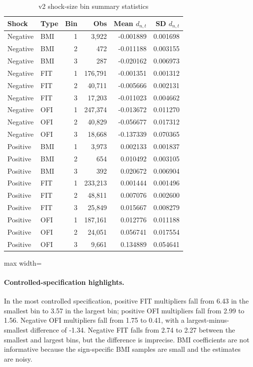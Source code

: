 \documentclass[11pt]{article}
\begin{document}
\begin{table}[H]
\centering
\caption{v2 shock-size bin summary statistics}
\label{tab:v2_bin_summary}
\begin{tabular}{llrrrr}
\toprule
Shock & Type & Bin & Obs & Mean $d_{n,t}$ & SD $d_{n,t}$ \\
\midrule
Negative & BMI & 1 & 3,922 & -0.001889 & 0.001698 \\
Negative & BMI & 2 & 472 & -0.011188 & 0.003155 \\
Negative & BMI & 3 & 287 & -0.020162 & 0.006973 \\
Negative & FIT & 1 & 176,791 & -0.001351 & 0.001312 \\
Negative & FIT & 2 & 40,711 & -0.005666 & 0.002131 \\
Negative & FIT & 3 & 17,203 & -0.011023 & 0.004662 \\
Negative & OFI & 1 & 247,374 & -0.013672 & 0.011270 \\
Negative & OFI & 2 & 40,829 & -0.056677 & 0.017312 \\
Negative & OFI & 3 & 18,668 & -0.137339 & 0.070365 \\
\addlinespace
Positive & BMI & 1 & 3,973 & 0.002133 & 0.001837 \\
Positive & BMI & 2 & 654 & 0.010492 & 0.003105 \\
Positive & BMI & 3 & 392 & 0.020672 & 0.006904 \\
Positive & FIT & 1 & 233,213 & 0.001444 & 0.001496 \\
Positive & FIT & 2 & 48,811 & 0.007076 & 0.002600 \\
Positive & FIT & 3 & 25,849 & 0.015667 & 0.008279 \\
Positive & OFI & 1 & 187,161 & 0.012776 & 0.011188 \\
Positive & OFI & 2 & 24,051 & 0.056741 & 0.017554 \\
Positive & OFI & 3 & 9,661 & 0.134889 & 0.054641 \\
\bottomrule
\end{tabular}
\end{table}

\begin{table}[H]
\centering
\caption{v2 asymmetric multipliers by shock-size bin}
\label{tab:v2_asym_multipliers}
\begin{adjustbox}{max width=\textwidth}
\begingroup
\renewcommand{\vspace}[1]{}

\endgroup
\end{adjustbox}
\end{table}

\paragraph{Controlled-specification highlights.}
In the most controlled specification, positive FIT multipliers fall from 6.43
in the smallest bin to 3.57 in the largest bin; positive OFI multipliers fall
from 2.99 to 1.56. Negative OFI multipliers fall from 1.75 to 0.41, with a
largest-minus-smallest difference of -1.34. Negative FIT falls from 2.74 to
2.27 between the smallest and largest bins, but the difference is imprecise.
BMI coefficients are not informative because the sign-specific BMI samples are
small and the estimates are noisy.
\end{document}
